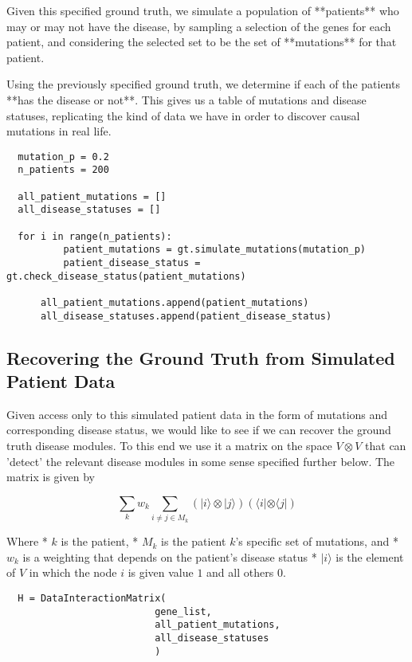 \documentclass[a4paper,english]{article}
\begin{document}
  Given this specified ground truth, we simulate a population of **patients** who may or may not have the disease, by sampling a selection of the genes for each patient, and considering the selected set to be the set of **mutations** for that patient.
  
  Using the previously specified ground truth, we determine if each of the patients **has the disease or not**. This gives us a table of mutations and disease statuses, replicating the kind of data we have in order to discover causal mutations  in real life.

\begin{lstlisting}
  mutation_p = 0.2
  n_patients = 200
      
  all_patient_mutations = []
  all_disease_statuses = []
  
  for i in range(n_patients):
          patient_mutations = gt.simulate_mutations(mutation_p)
          patient_disease_status = gt.check_disease_status(patient_mutations)
          
      all_patient_mutations.append(patient_mutations)
      all_disease_statuses.append(patient_disease_status)
\end{lstlisting}
\subsection{Recovering the Ground Truth from Simulated Patient Data}
  
  Given access only to this simulated patient data in the form of mutations and corresponding disease status, we would like to see if we can recover the ground truth disease modules. To this end we use it  a matrix on the space $V \otimes V$ that can 'detect' the relevant disease modules in some sense specified further below. The matrix is given by
  
  $$ \sum_{k} w_k \sum_{i \neq j \in M_k} (|i\rangle \otimes | j \rangle) (\langle i|\otimes \langle j |)  $$
  
  Where 
  * $k$ is the patient, 
  * $M_k$ is the patient $k$'s specific set of mutations, and
  * $w_k$ is a weighting that depends on the patient's disease status
  * $|i\rangle$ is the element of $V$ in which the node $i$ is given value $1$ and all others $0$.
  
  
  
  
  
  
\begin{lstlisting}
  H = DataInteractionMatrix(
                          gene_list,
                          all_patient_mutations,
                          all_disease_statuses
                          )
\end{lstlisting}
  
\end{document}
